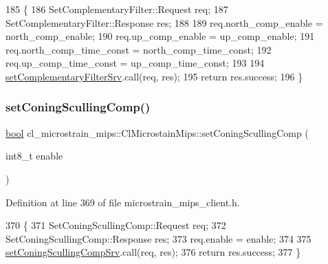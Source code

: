\begin{DoxyCode}
185     \{
186         SetComplementaryFilter::Request req;
187         SetComplementaryFilter::Response res;
188 
189         req.north\_comp\_enable = north\_comp\_enable;
190         req.up\_comp\_enable = up\_comp\_enable;
191         req.north\_comp\_time\_const = north\_comp\_time\_const;
192         req.up\_comp\_time\_const = up\_comp\_time\_const;
193 
194         \hyperlink{classcl__microstrain__mips_1_1ClMicrostainMips_a54045931a06f909418ac284235c5dd5a}{setComplementaryFilterSrv}.call(req, res);
195         \textcolor{keywordflow}{return} res.success;
196     \}
\end{DoxyCode}
\mbox{\label{classcl__microstrain__mips_1_1ClMicrostainMips_a981895d2724594166bcf22247382ddcf}} 
\subsubsection{\texorpdfstring{set\+Coning\+Sculling\+Comp()}{setConingScullingComp()}}
{\footnotesize\ttfamily \hyperlink{classbool}{bool} cl\+\_\+microstrain\+\_\+mips\+::\+Cl\+Microstain\+Mips\+::set\+Coning\+Sculling\+Comp (\begin{DoxyParamCaption}\item[{int8\+\_\+t}]{enable }\end{DoxyParamCaption})\hspace{0.3cm}{\ttfamily [inline]}}



Definition at line 369 of file microstrain\+\_\+mips\+\_\+client.\+h.


\begin{DoxyCode}
370     \{
371         SetConingScullingComp::Request req;
372         SetConingScullingComp::Response res;
373         req.enable = enable;
374 
375         \hyperlink{classcl__microstrain__mips_1_1ClMicrostainMips_ae24545c615e2be170adced3999d94d84}{setConingScullingCompSrv}.call(req, res);
376         \textcolor{keywordflow}{return} res.success;
377     \}
\end{DoxyCode}
\mbox{\label{classcl__microstrain__mips_1_1ClMicrostainMips_aaa5987561df8840ec12ca1eecb852ad9}} 
